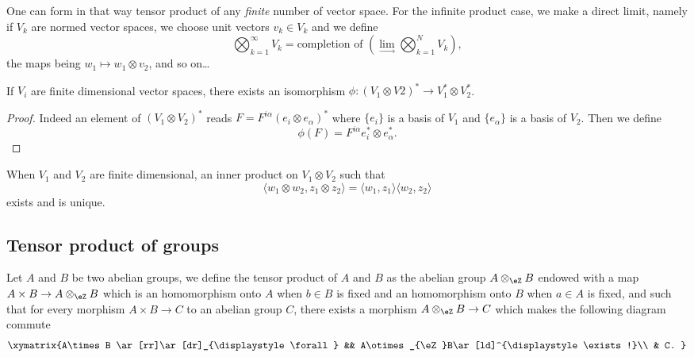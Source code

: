 One can form in that way tensor product of any \emph{finite} number of vector space. For the infinite product case, we make a direct limit, namely if $V_k$ are normed vector spaces, we choose unit vectors $v_k\in V_k$ and we define
\begin{equation}
\bigotimes_{k=1}^{\infty} V_k=\text{completion of }\left(\lim_{\rightarrow}\bigotimes_{k=1}^N V_k\right),
\end{equation}
the maps being $w_1\mapsto w_1\otimes v_2$, and so on\ldots

\begin{lemma}
If $V_i$ are finite dimensional vector spaces, there exists an isomorphism $\phi\colon (V_1\otimes V2)^*\to V_1^*\otimes V_2^*$. 
\end{lemma}
\begin{proof}
Indeed an element of $(V_1\otimes V_2)^*$ reads $F=F^{i\alpha}(e_i\otimes e_{\alpha})^*$ where $\{ e_i \}$ is a basis of $V_1$ and $\{ e_{\alpha} \}$ is a basis of $V_2$. Then we define
\[ 
  \phi(F)=F^{i\alpha}e_i^*\otimes e_{\alpha}^*.
\]
\end{proof}

\begin{lemma}
When $V_1$ and $V_2$ are finite dimensional, an inner product on $V_1\otimes V_2$ such that
\[ 
  \langle w_1\otimes w_2, z_1\otimes z_2\rangle =\langle w_1, z_1\rangle \langle w_2, z_2\rangle 
\]
exists and is unique.
\end{lemma}

					\subsection{Tensor product of groups}

Let $A$ and $B$ be two abelian groups, we define the tensor product of $A$ and $B$ as the abelian group $A\otimes_{\eZ}B$ endowed with a map $A\times B\to A\otimes_{\eZ}B$ which is an homomorphism onto $A$ when $b\in B$ is fixed and an homomorphism onto $B$ when $a\in A$ is fixed, and such that for every morphism $A\times B\to C$ to an abelian group $C$, there exists a morphism $A\otimes_{\eZ}B\to C$ which makes the following diagram commute
\[ 
\xymatrix{%
   A\times B \ar[rr]\ar[dr]_{\displaystyle\forall}		&&	A\otimes_{\eZ}B\ar[ld]^{\displaystyle\exists !}\\
								& C.
}
\]

